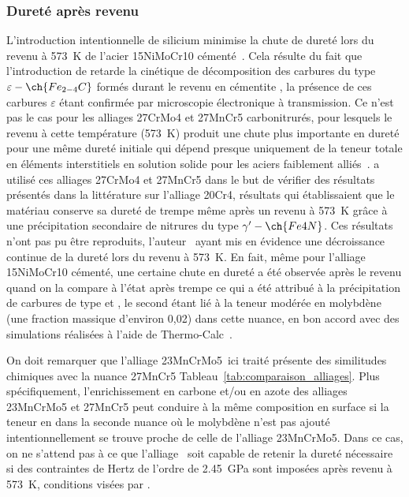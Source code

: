 \subsubsection*{Dureté après revenu} 

L'introduction intentionnelle de silicium minimise la chute de dureté lors du revenu à \SI{573}{\kelvin} de l'acier 15NiMoCr10 cémenté~\cite{Loukachenko2006}. Cela résulte du fait que l'introduction de  retarde la cinétique de décomposition des carbures du type $\varepsilon-\ch{Fe_{2-4}C}$ formés durant le revenu en cémentite , la présence de ces carbures $\varepsilon$ étant confirmée par microscopie électronique à transmission. Ce n'est pas le cas pour les alliages 27CrMo4 et 27MnCr5 carbonitrurés, pour lesquels le revenu à cette température (\SI{573}{\kelvin}) produit une chute plus importante en dureté pour une même dureté initiale \textendash{} qui dépend presque uniquement de la teneur totale en éléments interstitiels en solution solide pour les aciers faiblement alliés~\cite{Grange1977}. \citet{Loukachenko2006} a utilisé ces alliages \textendash{} 27CrMo4 et 27MnCr5 \textendash{} dans le but de vérifier des résultats présentés dans la littérature sur l'alliage 20Cr4, résultats qui établissaient que le matériau conserve sa dureté \og{}de trempe\fg{} même après un revenu à \SI{573}{\kelvin} grâce à une précipitation secondaire de nitrures du type $\gamma^{\prime}-\ch{Fe4N}$. Ces résultats n'ont pas pu être reproduits, l'auteur~\cite{Loukachenko2006} ayant mis en évidence une décroissance continue de la dureté lors du revenu à \SI{573}{\kelvin}. En fait, même pour l'alliage 15NiMoCr10 cémenté, une certaine chute en dureté a été observée après le revenu \textendash{} quand on la compare à l'état après trempe \textendash{} ce qui a été attribué à la précipitation de carbures de type  et , le second étant lié à la teneur modérée en molybdène (une fraction massique d'environ 0,02) dans cette nuance, en bon accord avec des simulations réalisées à l'aide de Thermo-Calc~\cite{Andersson2002,Borgenstam2000}. 

On doit remarquer que l'alliage 23MnCrMo5 ici traité présente des similitudes chimiques avec la nuance 27MnCr5 \textemdash{} Tableau~\ref{tab:comparaison_alliages}. Plus spécifiquement, l'enrichissement en carbone et/ou en azote des alliages 23MnCrMo5 et 27MnCr5 peut conduire à la même composition en surface si la teneur en  dans la seconde nuance \textendash{} où le molybdène n'est pas ajouté intentionnellement \textendash{} se trouve proche de celle de l'alliage 23MnCrMo5. Dans ce cas, on ne s'attend pas à ce que l'alliage  soit capable de retenir la dureté nécessaire si des contraintes de Hertz de l'ordre de \SI{2,45}{\giga\pascal} sont imposées après revenu à \SI{573}{\kelvin}, conditions visées par \citet{Loukachenko2006}.

